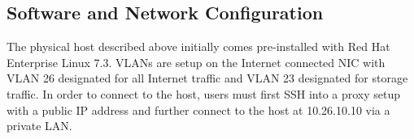 \subsection{Software and Network Configuration}
\label{sec:software}

The physical host described above initially comes pre-installed with Red
Hat Enterprise Linux 7.3. VLANs are setup on the Internet connected NIC
with VLAN 26 designated for all Internet traffic and VLAN 23 designated
for storage traffic. In order to connect to the host, users must first
SSH into a proxy setup with a public IP address and further connect to
the host at 10.26.10.10 via a private LAN.
